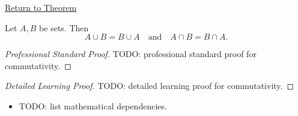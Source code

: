 \newpage
{}
\label{prf:commutativity}

\begin{remark*}[Return]
\hyperref[thm:commutativity]{Return to Theorem}
\end{remark*}

\begin{theorem*}
Let $A,B$ be sets. Then
\[
A \cup B = B \cup A
\quad\text{and}\quad
A \cap B = B \cap A.
\]
\end{theorem*}

\begin{proof}[Professional Standard Proof]
\LRAProofBodyStart
TODO: professional standard proof for commutativity.
\end{proof}

\begin{proof}[Detailed Learning Proof]
\LRAProofBodyStart
TODO: detailed learning proof for commutativity.
\end{proof}

\begin{remark*}
\end{remark*}

\begin{dependencies}
\begin{itemize}
  \item TODO: list mathematical dependencies.
\end{itemize}
\end{dependencies}

\clearpage
